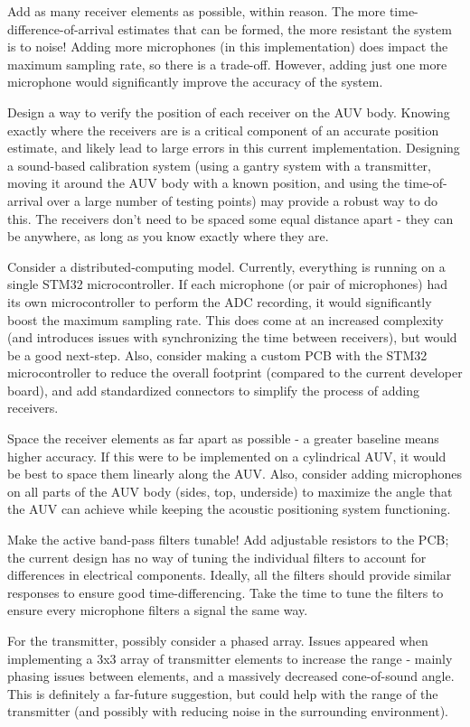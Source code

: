 \documentclass[12pt,a4paper]{report}
\begin{document}
Add as many receiver elements as possible, within reason. The more time-difference-of-arrival estimates that can be formed, the more resistant the system is to noise! Adding more microphones (in this implementation) does impact the maximum sampling rate, so there is a trade-off. However, adding just one more microphone would significantly improve the accuracy of the system.

Design a way to verify the position of each receiver on the AUV body. Knowing exactly where the receivers are is a critical component of an accurate position estimate, and likely lead to large errors in this current implementation. Designing a sound-based calibration system (using a gantry system with a transmitter, moving it around the AUV body with a known position, and using the time-of-arrival over a large number of testing points) may provide a robust way to do this. The receivers don’t need to be spaced some equal distance apart - they can be anywhere, as long as you know exactly where they are.

Consider a distributed-computing model. Currently, everything is running on a single STM32 microcontroller. If each microphone (or pair of microphones) had its own microcontroller to perform the ADC recording, it would significantly boost the maximum sampling rate. This does come at an increased complexity (and introduces issues with synchronizing the time between receivers), but would be a good next-step. Also, consider making a custom PCB with the STM32 microcontroller to reduce the overall footprint (compared to the current developer board), and add standardized connectors to simplify the process of adding receivers.

Space the receiver elements as far apart as possible - a greater baseline means higher accuracy. If this were to be implemented on a cylindrical AUV, it would be best to space them linearly along the AUV. Also, consider adding microphones on all parts of the AUV body (sides, top, underside) to maximize the angle that the AUV can achieve while keeping the acoustic positioning system functioning.

Make the active band-pass filters tunable! Add adjustable resistors to the PCB; the current design has no way of tuning the individual filters to account for differences in electrical components. Ideally, all the filters should provide similar responses to ensure good time-differencing. Take the time to tune the filters to ensure every microphone filters a signal the same way.

For the transmitter, possibly consider a phased array. Issues appeared when implementing a 3x3 array of transmitter elements to increase the range - mainly phasing issues between elements, and a massively decreased cone-of-sound angle. This is definitely a far-future suggestion, but could help with the range of the transmitter (and possibly with reducing noise in the surrounding environment).
\end{document}
